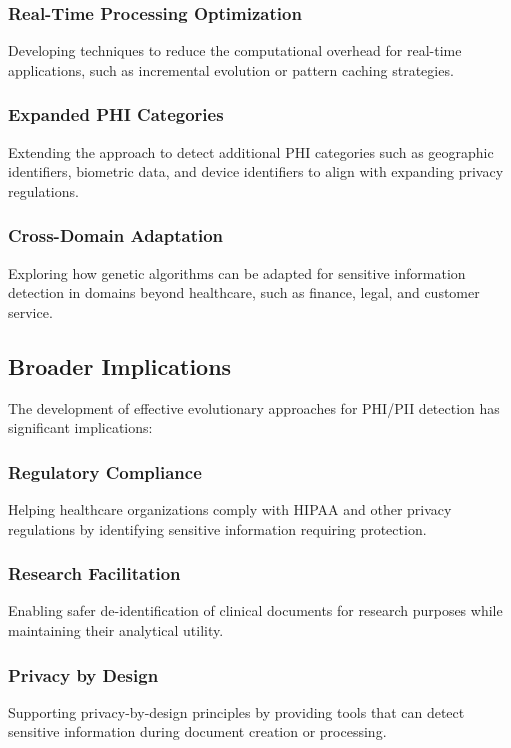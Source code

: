 \documentclass[conference]{IEEEtran}
\begin{document}
\subsubsection{Real-Time Processing Optimization} Developing techniques to reduce the computational overhead for real-time applications, such as incremental evolution or pattern caching strategies.

\subsubsection{Expanded PHI Categories} Extending the approach to detect additional PHI categories such as geographic identifiers, biometric data, and device identifiers to align with expanding privacy regulations.

\subsubsection{Cross-Domain Adaptation} Exploring how genetic algorithms can be adapted for sensitive information detection in domains beyond healthcare, such as finance, legal, and customer service.

\subsection{\textbf{Broader Implications}}
The development of effective evolutionary approaches for PHI/PII detection has significant implications:

\subsubsection{Regulatory Compliance} Helping healthcare organizations comply with HIPAA and other privacy regulations by identifying sensitive information requiring protection.

\subsubsection{Research Facilitation} Enabling safer de-identification of clinical documents for research purposes while maintaining their analytical utility.

\subsubsection{Privacy by Design} Supporting privacy-by-design principles by providing tools that can detect sensitive information during document creation or processing.
\end{document}
